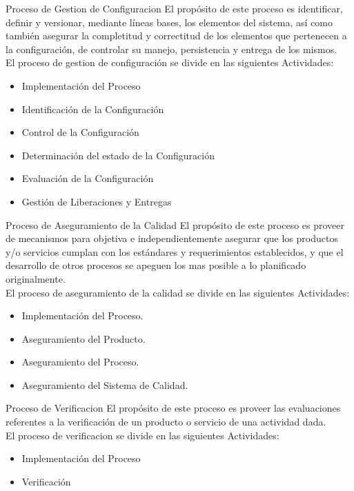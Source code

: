 \documentclass{beamer}
\begin{document}
			\begin{frame}{Proceso de Gestion de Configuracion}
				El propósito de este proceso es identificar, definir y versionar, mediante líneas bases, los elementos del sistema, así como también asegurar la completitud y correctitud de los elementos que pertenecen a la configuración, de controlar su manejo, persistencia y entrega de los mismos.\\
				
				El proceso de gestion de configuración se divide en las siguientes Actividades:
					\begin{itemize}
						\item Implementación del Proceso
						\item Identificación de la Configuración
						\item Control de la Configuración
						\item Determinación del estado de la Configuración
						\item Evaluación de la Configuración
						\item Gestión de Liberaciones y Entregas
					\end{itemize}			
			\end{frame}
			
			\begin{frame}{Proceso de Aseguramiento de la Calidad}
				El propósito de este proceso es proveer de mecanismos para objetiva e independientemente asegurar que los productos y/o servicios cumplan con los estándares y requerimientos establecidos, y que el desarrollo de otros procesos se apeguen los mas posible a lo planificado originalmente.\\
				
				El proceso de aseguramiento de la calidad se divide en las siguientes Actividades:
					\begin{itemize}
						\item Implementación del Proceso.
						\item Aseguramiento del Producto.
						\item Aseguramiento del Proceso.
						\item Aseguramiento del Sistema de Calidad.
					\end{itemize}
			\end{frame}
			
			\begin{frame}{Proceso de Verificacion}
				El propósito de este proceso es proveer las evaluaciones referentes a la verificación de un producto o servicio de una actividad dada.\\
				
				El proceso de verificacion se divide en las siguientes Actividades:					
					\begin{itemize}
						\item Implementación del Proceso
						\item Verificación
					\end{itemize}
			\end{frame}
			
\end{document}
